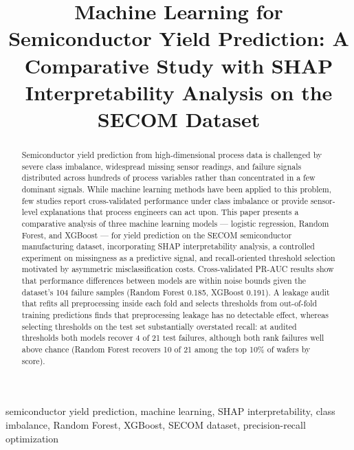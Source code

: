 \documentclass[conference]{IEEEtran}
\begin{document}
\title{Machine Learning for Semiconductor Yield Prediction: A 
Comparative Study with SHAP Interpretability Analysis on the 
SECOM Dataset}

\author{
}

\maketitle

\begin{abstract}
Semiconductor yield prediction from high-dimensional process data 
is challenged by severe class imbalance, widespread missing sensor 
readings, and failure signals distributed across hundreds of process 
variables rather than concentrated in a few dominant signals. While 
machine learning methods have been applied to this problem, few 
studies report cross-validated performance under class imbalance or 
provide sensor-level explanations that process engineers can act 
upon. This paper presents a comparative analysis of three machine 
learning models --- logistic regression, Random Forest, and XGBoost 
--- for yield prediction on the SECOM semiconductor manufacturing 
dataset, incorporating SHAP interpretability analysis, a controlled 
experiment on missingness as a predictive signal, and recall-oriented 
threshold selection motivated by asymmetric misclassification costs. 
Cross-validated PR-AUC results show that performance differences
between models are within noise bounds given the dataset's 104
failure samples (Random Forest 0.185, XGBoost 0.191). A leakage
audit that refits all preprocessing inside each fold and selects
thresholds from out-of-fold training predictions finds that
preprocessing leakage has no detectable effect, whereas selecting
thresholds on the test set substantially overstated recall: at
audited thresholds both models recover 4 of 21 test failures,
although both rank failures well above chance (Random Forest
recovers 10 of 21 among the top 10\% of wafers by score).
\end{abstract}

\begin{IEEEkeywords}
semiconductor yield prediction, machine learning, SHAP 
interpretability, class imbalance, Random Forest, XGBoost, 
SECOM dataset, precision-recall optimization
\end{IEEEkeywords}
\end{document}
